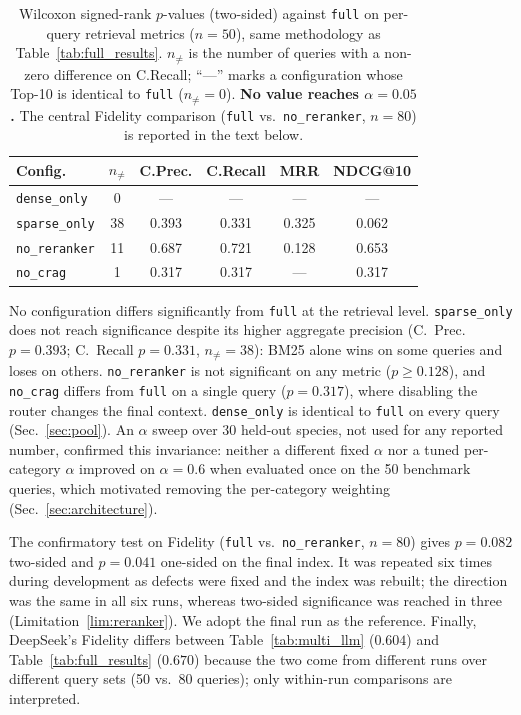 \documentclass[runningheads]{llncs}
\begin{document}
\begin{table}[!ht]
\centering
\caption{Wilcoxon signed-rank $p$-values (two-sided) against \texttt{full} on per-query retrieval metrics ($n{=}50$), same methodology as Table~\ref{tab:full_results}. $n_{\neq}$ is the number of queries with a non-zero difference on C.Recall; ``---'' marks a configuration whose Top-10 is identical to \texttt{full} ($n_{\neq}{=}0$). \textbf{No value reaches $\alpha{=}0.05$.} The central Fidelity comparison (\texttt{full} vs.\ \texttt{no\_reranker}, $n{=}80$) is reported in the text below.}
\label{tab:wilcoxon}
\footnotesize
\begin{tabular}{l c c c c c}
\toprule
\textbf{Config.} & \textbf{$n_{\neq}$} & \textbf{C.Prec.} & \textbf{C.Recall} & \textbf{MRR} & \textbf{NDCG@10} \\
\midrule
\texttt{dense\_only}    &  0 & --- & --- & --- & --- \\
\texttt{sparse\_only} & 38 & 0.393 & 0.331 & 0.325 & 0.062 \\
\texttt{no\_reranker} & 11 & 0.687 & 0.721 & 0.128 & 0.653 \\
\texttt{no\_crag} &  1 & 0.317 & 0.317 & --- & 0.317 \\
\bottomrule
\end{tabular}
\end{table}

No configuration differs significantly from \texttt{full} at the retrieval level. \texttt{sparse\_only} does not reach significance despite its higher aggregate precision (C.\ Prec.\ $p{=}0.393$; C.\ Recall $p{=}0.331$, $n_{\neq}{=}38$): BM25 alone wins on some queries and loses on others. \texttt{no\_reranker} is not significant on any metric ($p{\geq}0.128$), and \texttt{no\_crag} differs from \texttt{full} on a single query ($p{=}0.317$), where disabling the router changes the final context. \texttt{dense\_only} is identical to \texttt{full} on every query (Sec.~\ref{sec:pool}). An $\alpha$ sweep over 30 held-out species, not used for any reported number, confirmed this invariance: neither a different fixed $\alpha$ nor a tuned per-category $\alpha$ improved on $\alpha{=}0.6$ when evaluated once on the 50 benchmark queries, which motivated removing the per-category weighting (Sec.~\ref{sec:architecture}).

The confirmatory test on Fidelity (\texttt{full} vs.\ \texttt{no\_reranker}, $n{=}80$) gives $p{=}0.082$ two-sided and $p{=}0.041$ one-sided on the final index. It was repeated six times during development as defects were fixed and the index was rebuilt; the direction was the same in all six runs, whereas two-sided significance was reached in three (Limitation~\ref{lim:reranker}). We adopt the final run as the reference. Finally, DeepSeek's Fidelity differs between Table~\ref{tab:multi_llm} ($0.604$) and Table~\ref{tab:full_results} ($0.670$) because the two come from different runs over different query sets (50 vs.\ 80 queries); only within-run comparisons are interpreted.
\end{document}

